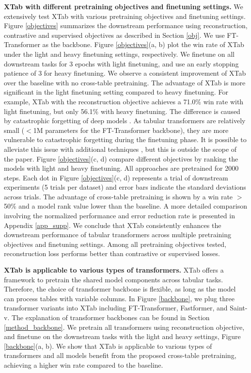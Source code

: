\textbf{XTab with different pretraining objectives and finetuning settings.} We extensively test XTab with various pretraining objectives and finetuning settings. Figure \ref{objectives} summarizes the downstream performance using reconstruction, contrastive and supervised objectives as described in Section \ref{obj}. We use FT-Transformer as the backbone. Figure \ref{objectives}(a, b) plot the win rate of XTab under the light and heavy finetuning settings, respectively. We finetune on all downstream tasks for 3 epochs with light finetuning, and use an early stopping patience of 3 for heavy finetuning. We observe a consistent improvement of XTab over the baseline with no cross-table pretraining. The advantage of XTab is more significant in the light finetuning setting compared to heavy finetuning. For example, XTab with the reconstruction objective achieves a 71.0\% win rate with light finetuning, but only 56.1\% with heavy finetuning. The difference is caused by catastrophic forgetting of deep models \citep{ramasesh2021effect, kaushik2021understanding}. As tabular transformers are relatively small ($<$1M parameters for the FT-Transformer backbone), they are more vulnerable to catastrophic forgetting during the finetuning phase. It is possible to alleviate this issue with additional techniques \citep{ramasesh2021effect, kaushik2021understanding}, but this is outside the scope of the paper. Figure \ref{objectives}(c, d) compare different objectives by ranking the models with light and heavy finetuning. All approaches are pretrained for 2000 steps. Each dot in Figure \ref{objectives}(c, d) represents a trial of downstream experiments (5 trials per dataset) and error bars indicate the standard deviations across trials. The advantage of cross-table pretraining is shown by a win rate $>$50\% and a model rank value lower than the baseline. A more detailed comparison involving the normalized performance and error reduction rate is presented in Appendix \ref{app_supp}. We conclude that XTab consistently enhances the downstream performance of tabular transformers across multiple pretraining objectives and finetuning settings. Among all pretraining objectives tested, reconstruction loss performs better than contrastive or supervised losses. 

\textbf{XTab is applicable to various types of transformers.} XTab offers a framework to pretrain the shared model components across tabular tasks. Therefore, the choice of transformer backbone is flexible, as long as the model can process tables with variable columns. In Figure \ref{backbone}, we plug three transformer variants into XTab including FT-Transformer, Fastformer, and Saint-v. The explanation of transformer backbones can be found in Section \ref{method_backbone}. We pretrain all transformers using reconstruction objective, and finetune on the downstream tasks with the light and heavy settings, Figure \ref{backbone}(a, b). We show that XTab is applicable to various types of transformers and all models benefit from the proposed cross-table pretraining, achieving a higher win rate compared to the baseline.

